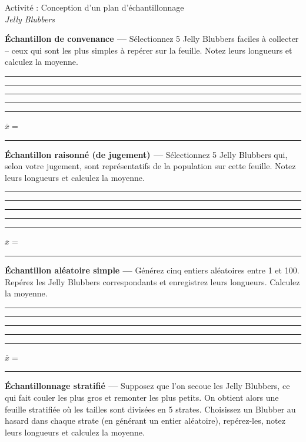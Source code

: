 \documentclass[11pt]{article}
\begin{document}
\begin{center}
{\LARGE Activité : Conception d’un plan d’échantillonnage\\[0.4em]}
{\Large \textit{Jelly Blubbers}}
\end{center}

\textbf{Échantillon de convenance —}
Sélectionnez 5 Jelly Blubbers faciles à collecter – ceux qui sont les plus simples à repérer sur la feuille.
Notez leurs longueurs et calculez la moyenne.\\[-0.4em]

\rule{1.6cm}{0.4pt}\hspace{0.6em}
\rule{1.6cm}{0.4pt}\hspace{0.6em}
\rule{1.6cm}{0.4pt}\hspace{0.6em}
\rule{1.6cm}{0.4pt}\hspace{0.6em}
\rule{1.6cm}{0.4pt}\hfill
$\bar{x} = $ \rule{2.2cm}{0.4pt}

\textbf{Échantillon raisonné (de jugement) —}
Sélectionnez 5 Jelly Blubbers qui, selon votre jugement, sont représentatifs de la population sur cette feuille.
Notez leurs longueurs et calculez la moyenne.\\[-0.4em]

\rule{1.6cm}{0.4pt}\hspace{0.6em}
\rule{1.6cm}{0.4pt}\hspace{0.6em}
\rule{1.6cm}{0.4pt}\hspace{0.6em}
\rule{1.6cm}{0.4pt}\hspace{0.6em}
\rule{1.6cm}{0.4pt}\hfill
$\bar{x} = $ \rule{2.2cm}{0.4pt}

\textbf{Échantillon aléatoire simple —}
Générez cinq entiers aléatoires entre 1 et 100. Repérez les Jelly Blubbers correspondants et enregistrez leurs longueurs.
Calculez la moyenne.\\[-0.4em]

\rule{1.6cm}{0.4pt}\hspace{0.6em}
\rule{1.6cm}{0.4pt}\hspace{0.6em}
\rule{1.6cm}{0.4pt}\hspace{0.6em}
\rule{1.6cm}{0.4pt}\hspace{0.6em}
\rule{1.6cm}{0.4pt}\hfill
$\bar{x} = $ \rule{2.2cm}{0.4pt}

\textbf{Échantillonnage stratifié —}
Supposez que l’on secoue les Jelly Blubbers, ce qui fait couler les plus gros et remonter les plus petits.
On obtient alors une feuille stratifiée où les tailles sont divisées en 5 strates.
Choisissez un Blubber au hasard dans chaque strate (en générant un entier aléatoire),
repérez-les, notez leurs longueurs et calculez la moyenne.\\[-0.4em]
\end{document}
